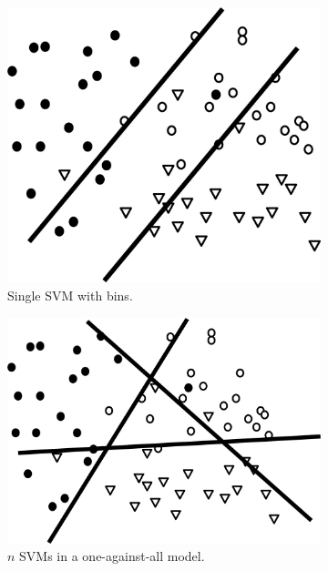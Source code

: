 \begin{figure}
\begin{subfigure}[b]{0.32\textwidth}  
            \centering 
            \includegraphics[width=.85\textwidth]{parts/chap-2/img-2/svm-par.png}
            \caption{Single SVM with bins.} 
            \label{mach:svm-model-gr-1}
        \end{subfigure}
        \hfill
        \begin{subfigure}[b]{0.32\textwidth}  
            \centering 
            \includegraphics[width=.98\textwidth]{parts/chap-2/img-2/svm-multi.png}
            \caption{$n$ SVMs in a one-against-all model.} 
            \label{mach:svm-model-gr-2}
        \end{subfigure}
        \hfill
        \begin{subfigure}[b]{0.32\textwidth}   

\end{subfigure}
\end{figure}
